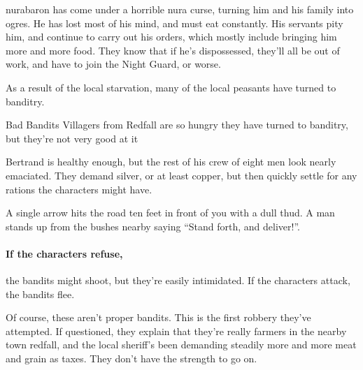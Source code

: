 \begin{multicols}{2}
\stopcontents[sq]

\resumecontents[Town]

\label{desperatemeasures}

\stopcontents[Town]

\startcontents[sq]

\sqminitoc

\gls{nurabaron} has come under a horrible nura curse, turning him and his family into ogres.
He has lost most of his mind, and must eat constantly.
His servants pity him, and continue to carry out his orders, which mostly include bringing him more and more food.  They know that if he's dispossessed, they'll all be out of work, and have to join the Night Guard, or worse.

As a result of the local starvation, many of the local peasants have turned to banditry.

{\N Bad Bandits}%
{Villagers from Redfall are so hungry they have turned to banditry, but they're not very good at it}%

Bertrand is healthy enough, but the rest of his crew of eight men look nearly emaciated.
They demand silver, or at least copper, but then quickly settle for any rations the characters might have.

\begin{boxtext}

	A single arrow hits the road ten feet in front of you with a dull thud.
	A man stands up from the bushes nearby saying ``Stand forth, and deliver!''.

\end{boxtext}

\paragraph{If the characters refuse,}
the bandits might shoot, but they're easily intimidated.  If the characters attack, the bandits flee.

Of course, these aren't proper bandits.
This is the first robbery they've attempted.
If questioned, they explain that they're really farmers in the nearby town \gls{redfall}, and the local sheriff's been demanding steadily more and more meat and grain as taxes.
They don't have the strength to go on.




\end{multicols}
